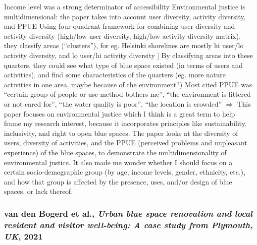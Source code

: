 \documentclass{article}
\begin{document}
\begin{outline}
		\2 Income level was a strong determinator of accessibility
	\1 Environmental justice is multidimensional: the paper takes into account user diversity, activity diversity, and PPUE
		\2 Using four-quadrant framework for combining user diversity and activity diversity (high/low user diversity, high/low activity diversity matrix), they classify areas (``clusters''), for eg. Helsinki shorelines are mostly hi user/lo activity diversity, and lo user/hi activity diversity ]
		\2 By classifying areas into these quarters, they could see what type of blue space existed (in terms of users and activities), and find some characteristics of the quarters (eg. more nature activities in one area, maybe because of the environment?)
	\1 Most cited PPUE was ``certain group of people or use method bothers me'', ``the environment is littered or not cared for'', ``the water quality is poor'', ``the location is crowded''
	\1 $\Rightarrow$ This paper focuses on environmental justice which I think is a great term to help frame my research interest, because it incorporates principles like sustainability, inclusivity, and right to open blue spaces. The paper looks at the diversity of users, diversity of activities, and the PPUE (perceived problems and unpleasant experience) of the blue spaces, to demonstrate the multidimensionality of environmental justice. It also made me wonder whether I should focus on a certain socio-demographic group (by age, income levels, gender, ethnicity, etc.), and  how that group is affected by the presence, uses, and/or design of blue spaces, or lack thereof. 

\end{outline}

\subsubsection{van den Bogerd et al., \textit{Urban blue space renovation and local resident and visitor well-being: A case study from Plymouth, UK}, 2021}

\parencite{van2021urban}
\end{document}
